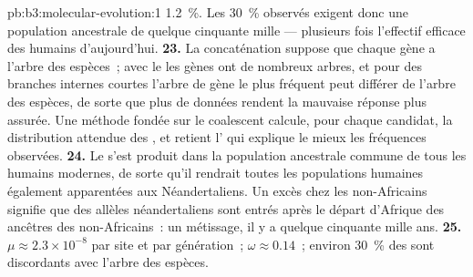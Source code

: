 \begin{solution}{pb:b3:molecular-evolution:1}
\qty{1.2}{\%}. Les \qty{30}{\%} observés exigent donc une population
ancestrale de quelque cinquante mille --- plusieurs fois l'effectif
efficace des humains d'aujourd'hui.
\textbf{23.} La concaténation suppose que chaque gène a l'arbre des
espèces~; avec le  les gènes ont de nombreux
arbres, et pour des branches internes courtes l'arbre de gène le plus
fréquent peut différer de l'arbre des espèces, de sorte que plus de
données rendent la mauvaise réponse plus assurée. Une méthode fondée sur
le coalescent calcule, pour chaque  candidat, la
distribution attendue des , et retient l'
qui explique le mieux les fréquences observées.
\textbf{24.} Le  s'est produit dans la
population ancestrale commune de tous les humains modernes, de sorte
qu'il rendrait toutes les populations humaines également apparentées aux
Néandertaliens. Un excès chez les non-Africains signifie que des allèles
néandertaliens sont entrés après le départ d'Afrique des ancêtres des
non-Africains~: un métissage, il y a quelque cinquante mille ans.
\textbf{25.} $\mu \approx 2.3\times 10^{-8}$ par site et par génération~;
$\omega \approx 0.14$~; environ \qty{30}{\%} des  sont
discordants avec l'arbre des espèces.
\end{solution}
